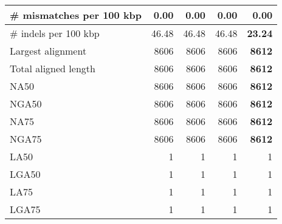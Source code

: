 \documentclass[12pt,a4paper]{article}
\begin{document}
\begin{table}[ht]
\begin{center}
\begin{tabular}{|l*{4}{|r}|}
\# mismatches per 100 kbp & 0.00 & 0.00 & 0.00 & 0.00 \\ \hline
\# indels per 100 kbp & 46.48 & 46.48 & 46.48 & {\bf 23.24} \\ \hline
Largest alignment & 8606 & 8606 & 8606 & {\bf 8612} \\ \hline
Total aligned length & 8606 & 8606 & 8606 & {\bf 8612} \\ \hline
NA50 & 8606 & 8606 & 8606 & {\bf 8612} \\ \hline
NGA50 & 8606 & 8606 & 8606 & {\bf 8612} \\ \hline
NA75 & 8606 & 8606 & 8606 & {\bf 8612} \\ \hline
NGA75 & 8606 & 8606 & 8606 & {\bf 8612} \\ \hline
LA50 & 1 & 1 & 1 & 1 \\ \hline
LGA50 & 1 & 1 & 1 & 1 \\ \hline
LA75 & 1 & 1 & 1 & 1 \\ \hline
LGA75 & 1 & 1 & 1 & 1 \\ \hline
\end{tabular}
\end{center}
\end{table}
\end{document}
